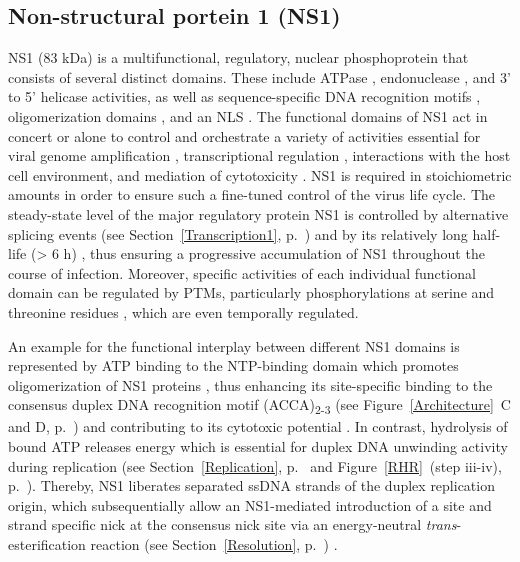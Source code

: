 \subsection{Non-structural portein 1 (NS1)}
\label{NS1}
NS1 (83 kDa) is a multifunctional, regulatory, nuclear phosphoprotein that consists of several distinct domains. These include ATPase \cite{pmid1833878}, endonuclease \cite{pmid12050365, pmid2527311, pmid7747462, pmid9349487}, and 3' to 5' helicase \cite{pmid8106366} activities, as well as sequence-specific DNA recognition motifs \cite{pmid9813208, pmid7853501, pmid17898054}, oligomerization domains \cite{pmid9311818}, and an NLS \cite{pmid8372437}. The functional domains of NS1 act in concert or alone to control and orchestrate a variety of activities essential for viral genome amplification \cite{pmid1388310, pmid8437230, pmid8076610}, transcriptional regulation \cite{pmid3171551, pmid1830114, pmid9454706}, interactions with the host cell environment, and mediation of cytotoxicity \cite{pmid2137660, pmid2167840, pmid1388209, pmid2144594}. NS1 is required in stoichiometric amounts in order to ensure such a fine-tuned control of the virus life cycle. The steady-state level of the major regulatory protein NS1 is controlled by alternative splicing events (see Section~\ref{Transcription1}, p.~\pageref{Transcription1}) and by its relatively long half-life (> 6 h) \cite{pmid2142555, pmid11437668}, thus ensuring  a progressive accumulation of NS1 throughout the course of infection. Moreover, specific activities of each individual functional domain can be regulated by PTMs, particularly phosphorylations at serine and threonine residues \cite{pmid4020958, pmid3739422}, which are even temporally regulated.

An example for the functional interplay between different NS1 domains is represented by ATP binding to the NTP-binding domain which promotes oligomerization of NS1 proteins \cite{pmid8372437}, thus enhancing its site-specific binding to the consensus duplex DNA recognition motif (ACCA)\textsubscript{2-3} (see Figure~\ref{Architecture}~C and D, p.~\pageref{Architecture}) \cite{pmid7853501} and contributing to its cytotoxic potential \cite{pmid2144594, pmid8317090, pmid11112491}. In contrast, hydrolysis of bound ATP releases energy \cite{pmid1833878} which is essential for duplex DNA unwinding activity \cite{pmid2159383, pmid1833878, pmid7853520, pmid7747462} during replication (see Section~\ref{Replication}, p.~\pageref{Replication} and Figure~\ref{RHR}~(step iii-iv), p.~\pageref{RHR}). Thereby, NS1 liberates separated ssDNA strands of the duplex replication origin, which subsequentially allow an NS1-mediated introduction of a site and strand specific nick at the consensus nick site via an energy-neutral \textit{trans}-esterification reaction (see Section~\ref{Resolution}, p.~\pageref{Resolution}) \cite{pmid2173787, pmid10516041, pmid11390575}.

